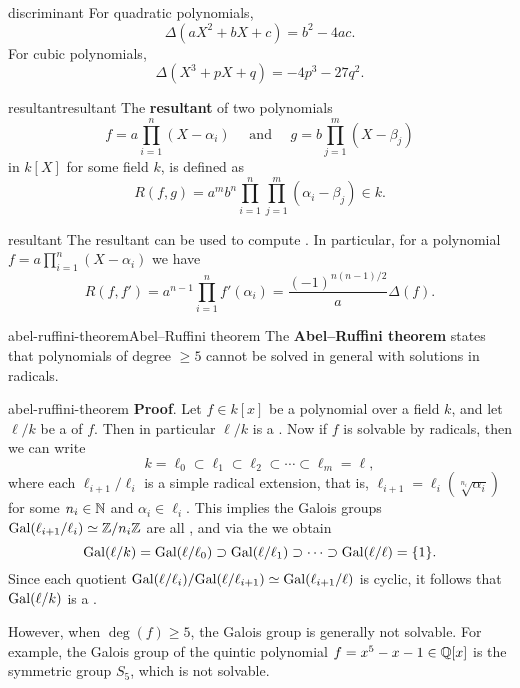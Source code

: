 \begin{example}{discriminant}
    For quadratic polynomials,
    \[ \Delta(aX^2 + bX + c) = b^2 - 4ac . \]
    For cubic polynomials,
    \[ \Delta(X^3 + pX + q) = -4p^3 - 27q^2 . \]
\end{example}

\begin{topic}{resultant}{resultant}
    The \textbf{resultant} of two polynomials
    \[ f = a \prod_{i = 1}^{n} (X - \alpha_i) \quad \text{ and } \quad g = b \prod_{j = 1}^{m} (X - \beta_j) \]
    in $k[X]$ for some field $k$, is defined as
    \[ R(f, g) = a^m b^n \prod_{i = 1}^{n} \prod_{j = 1}^{m} (\alpha_i - \beta_j) \in k . \]
\end{topic}

\begin{example}{resultant}
    The resultant can be used to compute . In particular, for a polynomial $f = a \prod_{i = 1}^{n} (X - \alpha_i)$ we have
    \[ R(f, f') = a^{n - 1} \prod_{i = 1}^{n} f'(\alpha_i) = \frac{(-1)^{n(n - 1)/2}}{a} \Delta(f) . \]
\end{example}

\begin{topic}{abel-ruffini-theorem}{Abel--Ruffini theorem}
    The \textbf{Abel--Ruffini theorem} states that polynomials of degree $\ge 5$ cannot be solved in general with solutions in radicals.
\end{topic}

\begin{example}{abel-ruffini-theorem}
    \textbf{Proof}. Let $f \in k[x]$ be a polynomial over a field $k$, and let $\ell/k$ be a  of $f$. Then in particular $\ell/k$ is a . Now if $f$ is solvable by radicals, then we can write
    \[ k = \ell_0 \subset \ell_1 \subset \ell_2 \subset \cdots \subset \ell_m = \ell , \]
    where each $\ell_{i + 1}/\ell_i$ is a simple radical extension, that is, $\ell_{i + 1} = \ell_i(\sqrt[n_i]{\alpha_i})$ for some $n_i \in \mathbb{N}$ and $\alpha_i \in \ell_i$. This implies the Galois groups $\textup{Gal}(\ell_{i + 1}/\ell_i) \simeq \mathbb{Z}/n_i\mathbb{Z}$ are all , and via the  we obtain
    \[ \textup{Gal}(\ell/k) = \textup{Gal}(\ell/\ell_0) \supset \textup{Gal}(\ell/\ell_1) \supset \cdots \supset \textup{Gal}(\ell/\ell) = \{ 1 \} . \]
    Since each quotient $\textup{Gal}(\ell/\ell_i) / \textup{Gal}(\ell/\ell_{i + 1}) \simeq \textup{Gal}(\ell_{i + 1}/\ell)$ is cyclic, it follows that $\textup{Gal}(\ell/k)$ is a .
    
    However, when $\deg(f) \ge 5$, the Galois group is generally not solvable. For example, the Galois group of the quintic polynomial $f = x^5 - x - 1 \in \mathbb{Q}[x]$ is the symmetric group $S_5$, which is not solvable.
\end{example}


